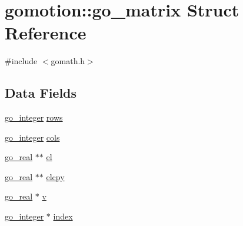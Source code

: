 \hypertarget{structgomotion_1_1go__matrix}{\section{gomotion\-:\-:go\-\_\-matrix Struct Reference}
\label{structgomotion_1_1go__matrix}
}


{\ttfamily \#include $<$gomath.\-h$>$}

\subsection*{Data Fields}
\begin{DoxyCompactItemize}
\item 
\hyperlink{gotypes_8h_a7d30f606bb0f58ffe2b3bd71e5c8af5c}{go\-\_\-integer} \hyperlink{structgomotion_1_1go__matrix_a7e46395453eb9731459d73cbaadd2cdf}{rows}
\item 
\hyperlink{gotypes_8h_a7d30f606bb0f58ffe2b3bd71e5c8af5c}{go\-\_\-integer} \hyperlink{structgomotion_1_1go__matrix_ab0f71737a0cd9fa476e687273f7cbbfb}{cols}
\item 
\hyperlink{gotypes_8h_afd666a2393eebd71ee455846ac9def9b}{go\-\_\-real} $\ast$$\ast$ \hyperlink{structgomotion_1_1go__matrix_ae1f2f89628116a3dc2b4282a01456678}{el}
\item 
\hyperlink{gotypes_8h_afd666a2393eebd71ee455846ac9def9b}{go\-\_\-real} $\ast$$\ast$ \hyperlink{structgomotion_1_1go__matrix_a4e37308ef1e80920a816adf1aa99f66d}{elcpy}
\item 
\hyperlink{gotypes_8h_afd666a2393eebd71ee455846ac9def9b}{go\-\_\-real} $\ast$ \hyperlink{structgomotion_1_1go__matrix_a46242c485b2f46d23f6b4997cb382392}{v}
\item 
\hyperlink{gotypes_8h_a7d30f606bb0f58ffe2b3bd71e5c8af5c}{go\-\_\-integer} $\ast$ \hyperlink{structgomotion_1_1go__matrix_a90ce357ba1351c682da4cf98e8a238bb}{index}
\end{DoxyCompactItemize}


